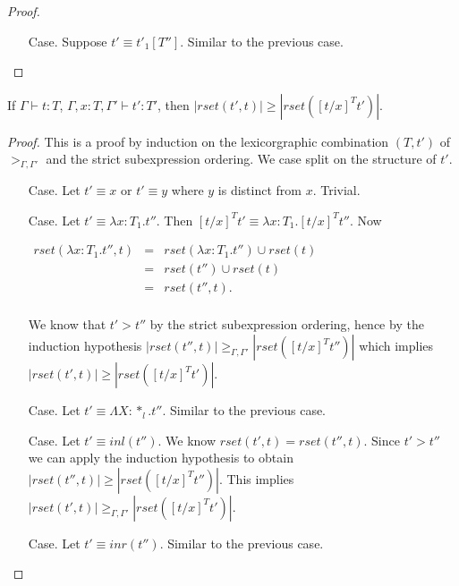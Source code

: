 \begin{proof}
\begin{itemize}
\item[Case.] Suppose $t' \equiv t'_1[T'']$. Similar to the previous
  case.  
\end{itemize}
\end{proof}

\begin{lemma}
  \label{lemma:redex_preserving_ssf}
  If $\Gamma \vdash t : T$, $\Gamma, x:T, \Gamma' \vdash t':T'$, then
  $|rset(t', t)| \geq |rset([t/x]^T t')|$.
\end{lemma}
\begin{proof}
  This is a proof by induction on the lexicorgraphic combination
$(T, t')$ of $>_{\Gamma,\Gamma'}$ and the strict subexpression ordering.
We case split on the structure of $t'$.  
\begin{itemize}
\item[Case.] Let $t' \equiv x$ or $t' \equiv y$ where $y$ is distinct from $x$.  Trivial. 
  
\item[Case.] Let $t' \equiv \lambda x:T_1.t''$.  Then $[t/x]^T t' \equiv \lambda x:T_1.[t/x]^T t''$.
  Now 
  \begin{center}
    \begin{math}
      \begin{array}{lll}
        rset(\lambda x:T_1.t'', t) & = & rset(\lambda x:T_1.t'') \cup rset(t)\\
        & = & rset(t'') \cup rset(t)\\
        & = & rset(t'', t).\\
      \end{array}
    \end{math}
  \end{center}
  We know that $t' > t''$ by the strict subexpression ordering, hence by the induction hypothesis
  $|rset(t'', t)| \geq_{\Gamma,\Gamma'} |rset([t/x]^T t'')|$ which implies $|rset(t', t)| \geq |rset([t/x]^T t')|$.
  
\item[Case.] Let $t' \equiv \Lambda X:*_l.t''$.  Similar to the previous case.
  
\item[Case.] Let $t' \equiv inl(t'')$. We know $rset(t', t) = rset(t'', t)$.  Since $t' > t''$ we can apply
  the induction hypothesis to obtain $|rset(t'', t)| \geq |rset([t/x]^T t'')|$.  This implies
  $|rset(t', t)| \geq_{\Gamma,\Gamma'} |rset([t/x]^T t')|$.
  
\item[Case.] Let $t' \equiv inr(t'')$. Similar to the previous case.
  

\end{itemize}
\end{proof}
